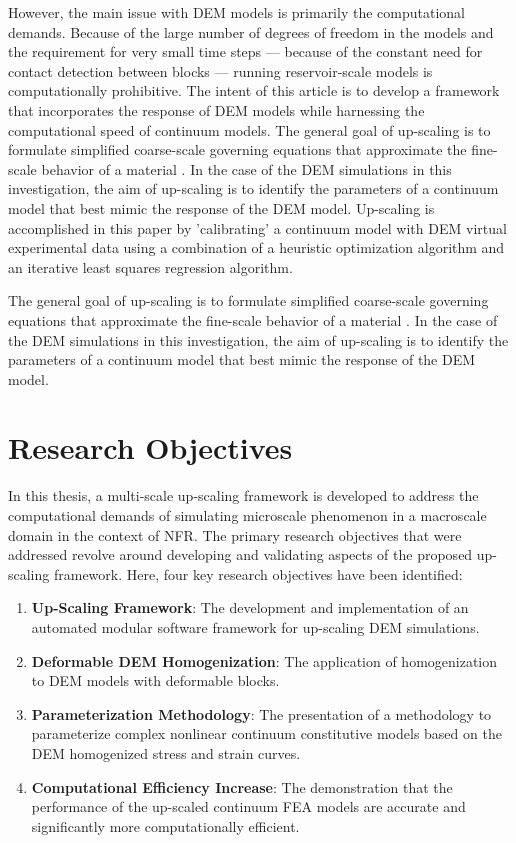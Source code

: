 However, the main issue with DEM models is primarily the computational demands. Because of the large number of degrees of freedom in the models and the requirement for very small time steps --- because of the constant need for contact detection between blocks --- running reservoir-scale models is computationally prohibitive. The intent of this article is to develop a framework that incorporates the response of DEM models while harnessing the computational speed of continuum models. The general goal of up-scaling is to formulate simplified coarse-scale governing equations that approximate the fine-scale behavior of a material \citep{Geers_2010}. In the case of the DEM simulations in this investigation, the aim of up-scaling is to identify the parameters of a continuum model that best mimic the response of the DEM model.  Up-scaling is accomplished in this paper by 'calibrating' a continuum model with DEM virtual experimental data using a combination of a heuristic optimization algorithm and an iterative least squares regression algorithm.

The general goal of up-scaling is to formulate simplified coarse-scale governing equations that approximate the fine-scale behavior of a material \citep{Geers_2010}. In the case of the DEM simulations in this investigation, the aim of up-scaling is to identify the parameters of a continuum model that best mimic the response of the DEM model.

\section{Research Objectives}

In this thesis, a multi-scale up-scaling framework is developed to address the computational demands of simulating microscale phenomenon in a macroscale domain in the context of NFR. The primary research objectives that were addressed revolve around developing and validating aspects of the proposed up-scaling framework. Here, four key research objectives have been identified:

\begin{enumerate}
\item \textbf{Up-Scaling Framework}: The development and implementation of an automated modular software framework for up-scaling DEM simulations.
\item \textbf{Deformable DEM Homogenization}: The application of homogenization to DEM models with deformable blocks.
\item \textbf{Parameterization Methodology}: The presentation of a methodology to parameterize complex nonlinear continuum constitutive models based on the DEM homogenized stress and strain curves.
\item \textbf{Computational Efficiency Increase}: The demonstration that the performance of the up-scaled continuum FEA models are accurate and significantly more computationally efficient.
\end{enumerate}

